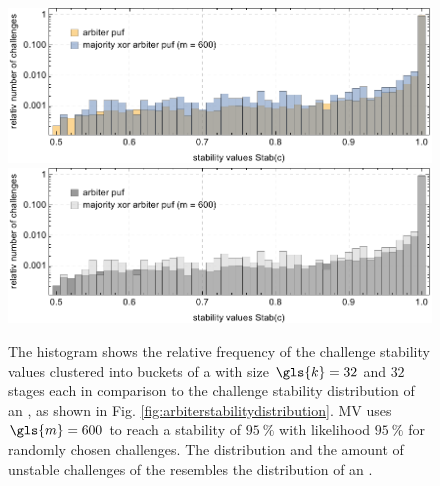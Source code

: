 \begin{figure}[ht]
\ifx{}\undefined
{}
\else
	\if{}
\centering
\includegraphics[width=1.00\textwidth]{images/comparison-arbiter-stability-distribution-majority-xor-stability-distribution.pdf}
	\else
\includegraphics[width=1.00\textwidth]{images/comparison-arbiter-stability-distribution-majority-xor-stability-distribution_mono.pdf}  
    \fi
\fi
\caption[Challenge stability distribution of a Majority \acs{XOR} \apuf]{The histogram shows the relative frequency of the challenge stability values clustered into buckets of a \mxpuf with size $\gls{k} = 32$ and $32$ stages each in comparison to the challenge stability distribution of an \apuf, as shown in Fig. \ref{fig:arbiterstabilitydistribution}. \ac{MV} uses $\gls{m} = 600$ to reach a stability of $95\ \%$ with likelihood $95\ \%$ for randomly chosen challenges. The distribution and the amount of unstable challenges of the \mxpuf resembles the distribution of an \apuf.} 
\label{fig:comparisonarbiterstabilitydistributionmajorityxorstabilitydistribution}
\end{figure}












